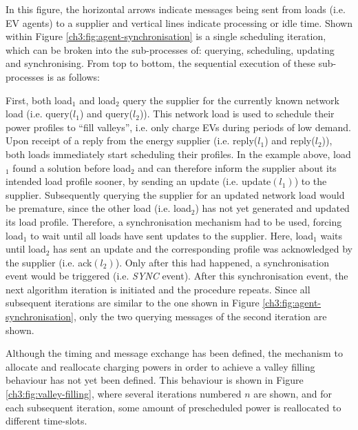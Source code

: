

In this figure, the horizontal arrows indicate messages being sent from loads (i.e. EV agents) to a supplier and vertical lines indicate processing or idle time.
Shown within Figure \ref{ch3:fig:agent-synchronisation} is a single scheduling iteration, which can be broken into the sub-processes of: querying, scheduling, updating and synchronising.
From top to bottom, the sequential execution of these sub-processes is as follows:

First, both load$_1$ and load$_2$ query the supplier for the currently known network load (i.e. query($l_1$) and query($l_2$)).
This network load is used to schedule their power profiles to ``fill valleys'', i.e. only charge EVs during periods of low demand.
Upon receipt of a reply from the energy supplier (i.e. reply($l_1$) and reply($l_2$)), both loads immediately start scheduling their profiles.
In the example above, load$_1$ found a solution before load$_2$ and can therefore inform the supplier about its intended load profile sooner, by sending an update (i.e. update$(l_1)$) to the supplier.
Subsequently querying the supplier for an updated network load would be premature, since the other load (i.e. load$_2$) has not yet generated and updated its load profile.
Therefore, a synchronisation mechanism had to be used, forcing load$_1$ to wait until all loads have sent updates to the supplier.
Here, load$_1$ waits until load$_2$ has sent an update and the corresponding profile was acknowledged by the supplier (i.e. ack$(l_2)$).
Only after this had happened, a synchronisation event would be triggered (i.e. \textit{SYNC} event).
After this synchronisation event, the next algorithm iteration is initiated and the procedure repeats.
Since all subsequent iterations are similar to the one shown in Figure \ref{ch3:fig:agent-synchronisation}, only the two querying messages of the  second iteration are shown.

Although the timing and message exchange has been defined, the mechanism to allocate and reallocate charging powers in order to achieve a valley filling behaviour has not yet been defined.
This behaviour is shown in Figure \ref{ch3:fig:valley-filling}, where several iterations numbered $n$ are shown, and for each subsequent iteration, some amount of prescheduled power is reallocated to different time-slots.



